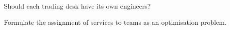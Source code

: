 \begin{interviewq}\label{iq:fm:engineering-organisation-design:5}
Should each trading desk have its own engineers?
\end{interviewq}

\begin{interviewq}\label{iq:fm:engineering-organisation-design:6}
Formulate the assignment of services to teams as an optimisation problem.
\end{interviewq}
